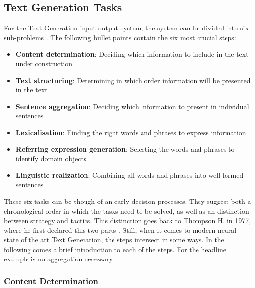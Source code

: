 \subsection{Text Generation Tasks}

For the Text Generation input-output system, the system can be divided into six sub-problems \cite{reiter}. The following bullet points contain the six most crucial steps:

\begin{itemize}
	\item \textbf{Content determination}: Deciding which information to include in the text under construction
	\item \textbf{Text structuring}: Determining in which order information will be presented in the text
	\item \textbf{Sentence aggregation}: Deciding which information to present in individual sentences
	\item \textbf{Lexicalisation}: Finding the right words and phrases to express information
	\item \textbf{Referring expression generation}: Selecting the words and phrases to identify domain objects
	\item \textbf{Linguistic realization}: Combining all words and phrases into well-formed sentences
\end{itemize}

These six tasks can be though of an early decision processes. They suggest both a chronological order in which the tasks need to be solved, as well as an distinction between strategy and tactics. This distinction goes back to Thompson H. in 1977, where he first declared this two parts \cite{thompson}. Still, when it comes to modern neural state of the art Text Generation, the steps intersect in some ways. In the following comes a brief introduction to each of the steps. For the headline example is no aggregation necessary.

\subsubsection{Content Determination}\label{ss:content}

